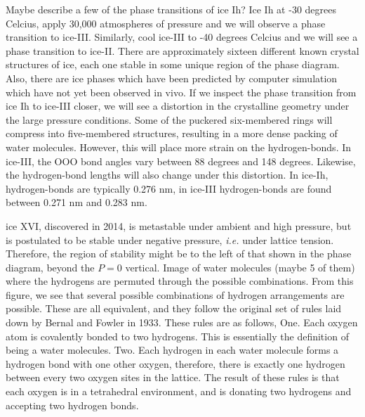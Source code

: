 Maybe describe a few of the phase transitions of ice Ih? Ice Ih at -30
degrees Celcius, apply 30,000 atmospheres of pressure and we will
observe a phase transition to ice-III. Similarly, cool ice-III to -40
degrees Celcius and we will see a phase transition to ice-II. There
are approximately sixteen different known crystal structures of ice,
each one stable in some unique region of the phase diagram. Also,
there are ice phases which have been predicted by computer simulation
which have not yet been observed in vivo. If we inspect the phase
transition from ice Ih to ice-III closer, we will see a distortion in
the crystalline geometry under the large pressure conditions. Some of
the puckered six-membered rings will compress into five-membered
structures, resulting in a more dense packing of water
molecules. However, this will place more strain on the
hydrogen-bonds. In ice-III, the OOO bond angles vary between 88
degrees and 148 degrees. Likewise, the hydrogen-bond lengths will also
change under this distortion. In ice-Ih, hydrogen-bonds are typically
0.276 nm, in ice-III hydrogen-bonds are found between 0.271 nm and
0.283 nm.

ice XVI, discovered in 2014, is metastable under ambient and high
pressure, but is postulated to be stable under negative pressure,
\textit{i.e.} under lattice tension. Therefore, the region of
stability might be to the left of that shown in the phase diagram,
beyond the $P = 0$ vertical. Image of water molecules (maybe 5 of
them) where the hydrogens are permuted through the possible
combinations. From this figure, we see that several possible
combinations of hydrogen arrangements are possible. These are all
equivalent, and they follow the original set of rules laid down by
Bernal and Fowler in 1933. These rules are as follows,
One. Each oxygen atom is covalently bonded to two hydrogens. This is
essentially the definition of being a water molecules. Two. Each
hydrogen in each water molecule forms a hydrogen bond with one other
oxygen, therefore, there is exactly one hydrogen between every two
oxygen sites in the lattice. The result of these rules is that each
oxygen is in a tetrahedral environment, and is donating two hydrogens
and accepting two hydrogen bonds. 

